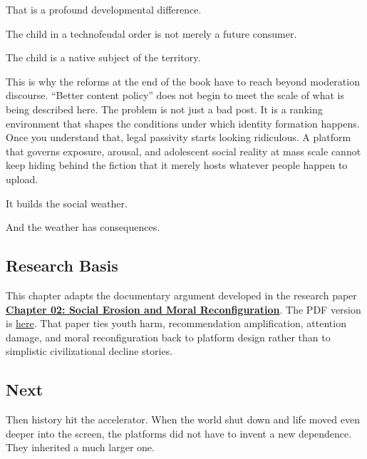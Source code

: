 \documentclass[
  american,
  12pt,
  letterpaper,
]{article}
\begin{document}
That is a profound developmental difference.

The child in a technofeudal order is not merely a future consumer.

The child is a native subject of the territory.

This is why the reforms at the end of the book have to reach beyond
moderation discourse. ``Better content policy'' does not begin to meet
the scale of what is being described here. The problem is not just a bad
post. It is a ranking environment that shapes the conditions under which
identity formation happens. Once you understand that, legal passivity
starts looking ridiculous. A platform that governs exposure, arousal,
and adolescent social reality at mass scale cannot keep hiding behind
the fiction that it merely hosts whatever people happen to upload.

It builds the social weather.

And the weather has consequences.

\subsection{Research Basis}\label{research-basis}

This chapter adapts the documentary argument developed in the research
paper
\href{../../papers/html/02_social-erosion-and-moral-reconfiguration_paper.html}{\textbf{Chapter
02: Social Erosion and Moral Reconfiguration}}. The PDF version is
\href{../../papers/pdf/02_social-erosion-and-moral-reconfiguration_paper/02_social-erosion-and-moral-reconfiguration_paper.pdf}{here}.
That paper ties youth harm, recommendation amplification, attention
damage, and moral reconfiguration back to platform design rather than to
simplistic civilizational decline stories.

\subsection{Next}\label{next}

Then history hit the accelerator. When the world shut down and life
moved even deeper into the screen, the platforms did not have to invent
a new dependence. They inherited a much larger one.
\end{document}
